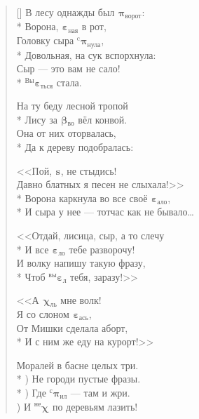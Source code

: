 \documentclass[a4paper,oneside,14pt]{scrbook}
\newcommand{\myPiz}[2]{$^{\text{#1}}${\large{$\boldsymbol{\pi}$}}$_{\text{#2}}$}
\newcommand{\myEbt}[2]{$^{\text{#1}}${\large{$\boldsymbol{\varepsilon}$}}$_{\text{#2}}$}
\newcommand{\myXyi}[2]{$^{\text{#1}}${\large{$\boldsymbol{\chi}$}}$_{\text{#2}}$}
\newcommand{\myBld}[2]{$^{\text{#1}}${\large{$\boldsymbol{\beta}$}}$_{\text{#2}}$}
\newcommand{\mySuk}[2]{$^{\text{#1}}${\large{$\boldsymbol{s}$}}$_{\text{#2}}$}
\begin{document}
    \settowidth{\versewidth}{Ворона каркнула во все своё ебало}
    \begin{verse}[\versewidth]
        В лесу однажды был {\myPiz{}{ворот}}:\\*
        Ворона, {\myEbt{}{ная}} в рот,\\
        Головку сыра {\myPiz{c}{нула}},\\*
        Довольная, на сук вспорхнула:\\
        Сыр --- это вам не сало!\\*
        {\myEbt{Вы}{ться}} стала.
        
        \vin На ту беду лесной тропой\\*
        \vin Лису за {\myBld{}{во}} вёл конвой.\\
        \vin Она от них оторвалась,\\*
        \vin Да к дереву подобралась:
        
        <<Пой, {\mySuk{}{}}, не стыдись!\\
        Давно блатных я песен не слыхала!>>\\*
        Ворона каркнула во все своё {\myEbt{}{ало}},\\*
        И сыра у нее --- тотчас как не бывало\ldots
        
        \vin <<Отдай, лисица, сыр, а то слечу\\*
        \vin И все {\myEbt{}{ло}} тебе разворочу!\\
        \vin И волку напишу такую фразу,\\*
        \vin Чтоб {\myEbt{вы}{л}} тебя, заразу!>>
        
        <<А {\myXyi{}{ль}} мне волк!\\
        Я со слоном {\myEbt{}{ась}},\\
        От Мишки сделала аборт,\\*
        И с ним же еду на курорт!>>
        
        \vin Моралей в басне целых три.\\*
        ) Не городи пустые фразы.\\*
        ) Где {\myPiz{с}{ил}} --- там и жри.\\
        ) И {\myXyi{не}{}} по деревьям лазить!
    \end{verse}
\end{document}
